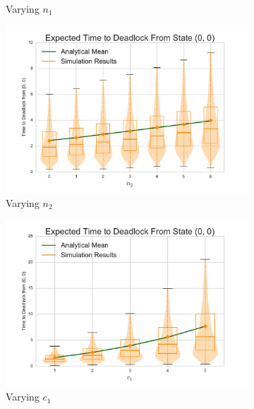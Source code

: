 \documentclass{article}
\begin{document}
\begin{figure}[!htbp]
\begin{center}
\begin{subfigure}[b]{0.34\textwidth}
    \caption{Varying $n_1$}
    \label{fig:2Nms_n1}
  \end{subfigure}
  \begin{subfigure}[b]{0.34\textwidth}
    \includegraphics[width=\textwidth]{images/varyn2_2Nms}
    \caption{Varying $n_2$}
    \label{fig:2Nms_n2}
  \end{subfigure}
  \begin{subfigure}[b]{0.34\textwidth}
    \includegraphics[width=\textwidth]{images/varyc1_2Nms}
    \caption{Varying $c_1$}
    \label{fig:2Nms_c1}
  \end{subfigure}
  \begin{subfigure}[b]{0.34\textwidth}

\end{subfigure}
\end{center}
\end{figure}
\end{document}
